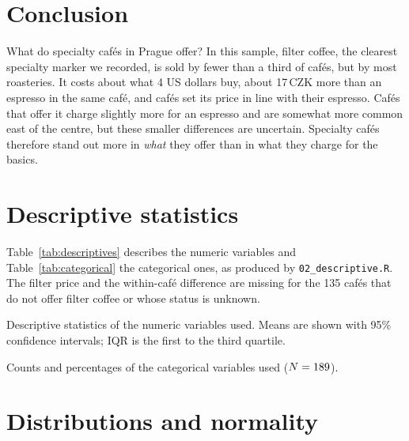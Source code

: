 \documentclass[11pt,a4paper]{article}
\newcommand{\fittable}[1]{\begin{adjustbox}{max width=\textwidth}\end{adjustbox}}
\begin{document}
\section{Conclusion}

What do specialty caf\'es in Prague offer? In this sample, filter coffee, the clearest specialty marker we recorded, is sold by fewer than a third of caf\'es, but by most roasteries. It costs about what 4 US dollars buy, about 17\,CZK more than an espresso in the same caf\'e, and caf\'es set its price in line with their espresso. Caf\'es that offer it charge slightly more for an espresso and are somewhat more common east of the centre, but these smaller differences are uncertain. Specialty caf\'es therefore stand out more in \emph{what} they offer than in what they charge for the basics.

\appendix
\renewcommand{\thesection}{\Alph{section}}
\titleformat{\section}{\large\bfseries}{\thesection.}{0.6em}{}

\section{Descriptive statistics}\label{app:descriptives}

Table~\ref{tab:descriptives} describes the numeric variables and Table~\ref{tab:categorical} the categorical ones, as produced by \texttt{02\_descriptive.R}. The filter price and the within-caf\'e difference are missing for the 135 caf\'es that do not offer filter coffee or whose status is unknown.

\begin{table}[H]
\centering\small
\caption{Descriptive statistics of the numeric variables used. Means are shown with 95\% confidence intervals; IQR is the first to the third quartile.}
\label{tab:descriptives}
\fittable{descriptives.tex}
\end{table}

\begin{table}[H]
\centering\small
\caption{Counts and percentages of the categorical variables used ($N = \Nall$).}
\label{tab:categorical}

\end{table}

\section{Distributions and normality}\label{app:distributions}
\end{document}
